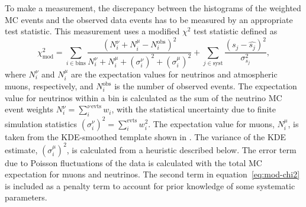 To make a measurement, the discrepancy between the histograms of the weighted MC events and the observed data events has to be measured by an appropriate test statistic.
This measurement uses a modified $\chi^2$ test statistic defined as
\begin{equation}
\chi^2_{\mathrm{mod}} = \sum_{i \in \mathrm{bins}}^{}\frac{(N^{\nu}_i + N^{\mu}_i - N^{\mathrm{obs}}_i)^2}{N^{\nu}_i + N^{\mu}_i + (\sigma^{\nu}_i)^2 + (\sigma^{\mu}_i)^2} + \sum_{j \in \mathrm{syst}}^{}\frac{(s_j - \hat{s_j})^2}{\sigma^2_{s_j}},
\label{eq:mod-chi2}
\end{equation}
\noindent where $N^{\nu}_i$ and $N^{\mu}_i$ are the expectation values for neutrinos and atmospheric muons, respectively, and $N^{\mathrm{obs}}_i$ is the number of observed events. The expectation value for neutrinos within a bin is calculated as the sum of the neutrino MC event weights $N^{\nu}_i = \sum_{i}^{\nu\,\mathrm{evts}} w_i$, with the statistical uncertainty due to finite simulation statistics $(\sigma^{\nu}_i)^2 = \sum_{i}^{\mathrm{evts}} w_i^2$.
The expectation value for muons, $N^{\mu}_i$, is taken from the KDE-smoothed template shown in .
The variance of the KDE estimate, $(\sigma^{\mu}_i)^2$, is calculated from a heuristic described below.
The error term due to Poisson fluctuations of the data is calculated with the total MC expectation for muons and neutrinos.
The second term in equation~\ref{eq:mod-chi2} is included as a penalty term to account for prior knowledge of some systematic parameters.

